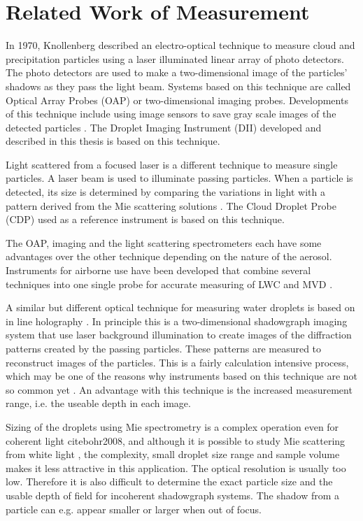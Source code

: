 \section{Related Work of Measurement}

In 1970, Knollenberg \cite{knoll1970} described an electro-optical technique to measure cloud and precipitation particles using a laser illuminated linear array of photo detectors. The photo detectors are used to make a two-dimensional image of the particles’ shadows as they pass the light beam. Systems based on this technique are called Optical Array Probes (OAP) or two-dimensional imaging probes. Developments of this technique include using image sensors to save gray scale images of the detected particles \cite{kulk2011,wend2013}. The Droplet Imaging Instrument (DII) developed and described in this thesis is based on this technique.

Light scattered from a focused laser \cite{baum1983,dye1984} is a different technique to measure single particles. A laser beam is used to illuminate passing particles. When a particle is detected, its size is determined by comparing the variations in light with a pattern derived from the Mie scattering solutions \cite{mie1908}. The Cloud Droplet Probe (CDP) used as a reference instrument is based on this technique.

The OAP, imaging and the light scattering spectrometers each have some advantages over the other technique depending on the nature of the aerosol. Instruments for airborne use have been developed that combine several techniques into one single probe for accurate measuring of LWC and MVD \cite{baum2001, baum2011}.

A similar but different optical technique for measuring water droplets is based on in line holography \cite{laws1995}. In principle this is a two-dimensional shadowgraph imaging system that use laser background illumination to create images of the diffraction patterns created by the passing particles. These patterns are measured to reconstruct images of the particles. This is a fairly calculation intensive process, which may be one of the reasons why instruments based on this technique are not so common yet \cite{henn2013}. An advantage with this technique is the increased measurement range, i.e. the useable depth in each image.

Sizing of the droplets using Mie spectrometry is a complex operation even for coherent light cite{bohr2008}, and although it is possible to study Mie scattering from white light \cite{ward2008}, the complexity, small droplet size range and sample volume makes it less attractive in this application. The optical resolution is usually too low. Therefore it is also difficult to determine the exact particle size and the usable depth of field for incoherent shadowgraph systems. The shadow from a particle can e.g. appear smaller or larger when out of focus.

